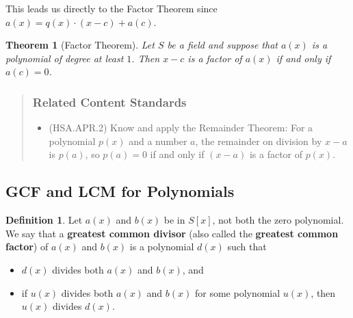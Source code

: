 \documentclass[
]{book}
\providecommand{\tightlist}{%
  \setlength{\itemsep}{0pt}\setlength{\parskip}{0pt}}
\newtheorem{theorem}{Theorem}[chapter]
\theoremstyle{definition}
\newtheorem{definition}{Definition}[chapter]
\theoremstyle{definition}
\theoremstyle{definition}
\theoremstyle{remark}
\begin{document}
This leads us directly to the Factor Theorem since \(a(x)=q(x)\cdot (x-c) + a(c)\).

\begin{theorem}[Factor Theorem]
\protect\hypertarget{thm:unnamed-chunk-199}{}{\label{thm:unnamed-chunk-199} {} }Let \(S\) be a field and suppose that \(a(x)\) is a polynomial of degree at least \(1\). Then \(x-c\) is a factor of \(a(x)\) if and only if \(a(c)=0\).
\end{theorem}

\begin{quote}
\hypertarget{related-content-standards-33}{%
\subsubsection*{Related Content Standards}\label{related-content-standards-33}}

\begin{itemize}
\tightlist
\item
  (HSA.APR.2) Know and apply the Remainder Theorem: For a polynomial \(p(x)\) and a number \(a\), the remainder on division by \(x-a\) is \(p(a)\), so \(p(a)=0\) if and only if \((x-a)\) is a factor of \(p(x)\).
\end{itemize}
\end{quote}

\hypertarget{gcf-and-lcm-for-polynomials}{%
\subsection{GCF and LCM for Polynomials}\label{gcf-and-lcm-for-polynomials}}

\begin{definition}
\protect\hypertarget{def:unnamed-chunk-200}{}{\label{def:unnamed-chunk-200} }Let \(a(x)\) and \(b(x)\) be in \(S[x]\), not both the zero polynomial. We say that a \textbf{greatest common divisor} (also called the \textbf{greatest common factor}) of \(a(x)\) and \(b(x)\) is a polynomial \(d(x)\) such that

\begin{itemize}
\tightlist
\item
  \(d(x)\) divides both \(a(x)\) and \(b(x)\), and
\item
  if \(u(x)\) divides both \(a(x)\) and \(b(x)\) for some polynomial \(u(x)\), then \(u(x)\) divides \(d(x)\).
\end{itemize}
\end{definition}
\end{document}
